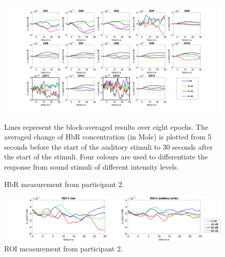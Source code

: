 \begin{figure}[H]
  \centering
    \includegraphics[scale=.4]{bilder/HbR_Mole/sub_gleb2_s_HbR.png}
  \caption{HbR measurement from participant 2.}
  \label{fig:somesignal}
  \medskip
  \footnotesize {Lines represent the block-averaged results over eight epochs. The averaged change of HbR concentration (in Mole) is plotted from 5 seconds before the start of the auditory stimuli to 30 seconds after the start of the stimuli. Four colours are used to differentiate the response from sound stimuli of different intensity levels.}
\end{figure}

\begin{figure}[H]
  \centering
    \includegraphics[scale=.29]{bilder/ROI/sub_gleb2_s_HbO.png}
  \caption{ROI measurement from participant 2.}
\end{figure}

\newpage

